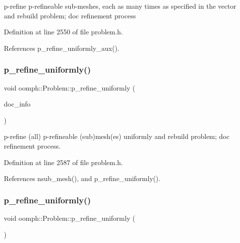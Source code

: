 p-\/refine p-\/refineable sub-\/meshes, each as many times as specified in the vector and rebuild problem; doc refinement process 



Definition at line 2550 of file problem.\+h.



References p\+\_\+refine\+\_\+uniformly\+\_\+aux().

\mbox{\label{classoomph_1_1Problem_a355caf4c06c3b8b5d399115048453921}} 
\subsubsection{\texorpdfstring{p\+\_\+refine\+\_\+uniformly()}{p\_refine\_uniformly()}\hspace{0.1cm}{\footnotesize\ttfamily [3/6]}}
{\footnotesize\ttfamily void oomph\+::\+Problem\+::p\+\_\+refine\+\_\+uniformly (\begin{DoxyParamCaption}\item[{\hyperlink{classoomph_1_1DocInfo}{Doc\+Info} \&}]{doc\+\_\+info }\end{DoxyParamCaption})\hspace{0.3cm}{\ttfamily [inline]}}



p-\/refine (all) p-\/refineable (sub)mesh(es) uniformly and rebuild problem; doc refinement process. 



Definition at line 2587 of file problem.\+h.



References nsub\+\_\+mesh(), and p\+\_\+refine\+\_\+uniformly().

\mbox{\label{classoomph_1_1Problem_ada439afd4d195644e53d6bdbc4b00587}} 
\subsubsection{\texorpdfstring{p\+\_\+refine\+\_\+uniformly()}{p\_refine\_uniformly()}\hspace{0.1cm}{\footnotesize\ttfamily [4/6]}}
{\footnotesize\ttfamily void oomph\+::\+Problem\+::p\+\_\+refine\+\_\+uniformly (\begin{DoxyParamCaption}{ }\end{DoxyParamCaption})\hspace{0.3cm}{\ttfamily [inline]}}




